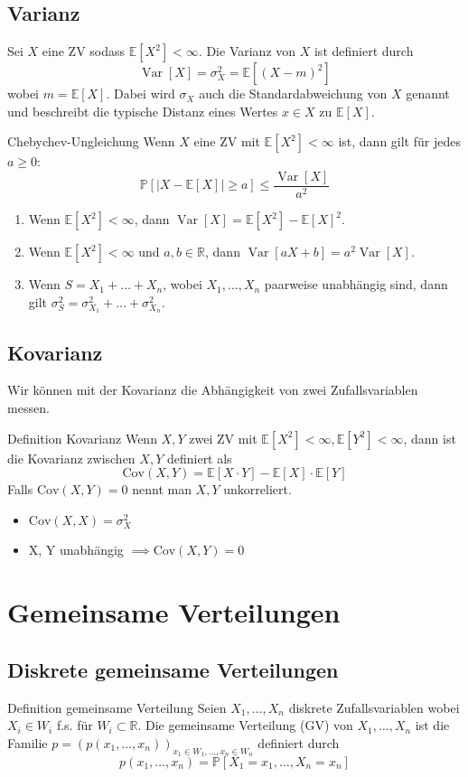 \documentclass[a4paper,10pt]{article}
\def\R{\mathbb{R}}
\def\P{\mathbb{P}}
\def\E{\mathbb{E}}
\DeclareMathOperator{\Var}{\text{Var}}
\begin{document}
\subsection{Varianz}
Sei \(X\) eine ZV sodass \(\E[X^2] < \infty\). Die Varianz von \(X\) ist definiert durch
\[\Var[X] = \sigma_X^2 = \E[(X-m)^2]\]
wobei \(m=\E[X]\). Dabei wird \(\sigma_X\) auch die Standardabweichung von \(X\) genannt und beschreibt die typische Distanz eines Wertes \(x\in X\) zu \(\E[X]\).

\begin{subbox}{Chebychev-Ungleichung}
	Wenn \(X\) eine ZV mit \(\E[X^2] < \infty\) ist, dann gilt für jedes \(a \ge 0\):
	\[\P[|X - \E[X]| \ge a] \le \frac{\Var[X]}{a^2}\]
\end{subbox}

\begin{enumerate}
	\item Wenn \(\E[X^2] < \infty\), dann \(\Var[X] = \E[X^2] - \E[X]^2\).
	\item Wenn \(\E[X^2] < \infty\) und \(a, b \in \R\), dann \(\Var[a X + b] = a^2 \Var[X]\).
	\item Wenn \(S = X_1 + \ldots + X_n\), wobei \(X_1, \ldots, X_n\) paarweise unabhängig sind, dann gilt \(\sigma_S^2 = \sigma_{X_1}^2 + \ldots + \sigma_{X_n}^2\).
\end{enumerate}

\subsection{Kovarianz}
Wir können mit der Kovarianz die Abhängigkeit von zwei Zufallsvariablen messen.
\begin{subbox}{Definition Kovarianz}
	Wenn \(X, Y\) zwei ZV mit \(\E[X^2] < \infty, \E[Y^2] < \infty\), dann ist die Kovarianz zwischen \(X, Y\) definiert als
	\[\text{Cov}(X,Y) = \E[X \cdot Y] - \E[X] \cdot \E[Y]\]
	Falls $\text{Cov}(X,Y) = 0$ nennt man $X, Y$ unkorreliert.
\end{subbox}
\begin{itemize}
	\item \(\text{Cov}(X,X) = \sigma_X^2\)
	\item X, Y unabhängig \(\implies \text{Cov}(X,Y) = 0\)
\end{itemize}

\section{Gemeinsame Verteilungen}
\subsection{Diskrete gemeinsame Verteilungen}
\begin{subbox}{Definition gemeinsame Verteilung}
	Seien \(X_1, \ldots, X_n\) diskrete Zufallsvariablen wobei \(X_i \in W_i\) f.s. für \(W_i \subset \R\). Die gemeinsame Verteilung (GV) von \(X_1, \ldots, X_n\) ist die Familie \(p = (p(x_1, \ldots, x_n))_{x_1 \in W_1, \ldots, x_n \in W_n}\) definiert durch
	\[p(x_1, \ldots, x_n) = \P[X_1 = x_1, \ldots, X_n = x_n]\]
\end{subbox}
\end{document}
